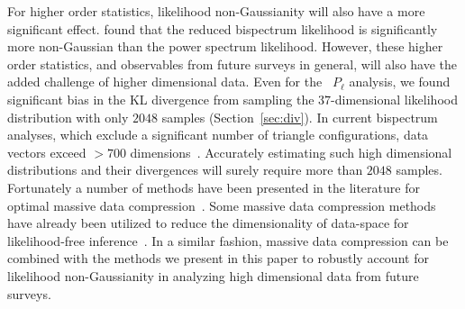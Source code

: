 \documentclass[12pt, letterpaper, preprint]{aastex6}
\newcommand{\Beut}{\citetalias{beutler2017}\xspace}
\let\oldmarginpar\marginpar
\renewcommand\marginpar[1]{\-\oldmarginpar[\raggedleft\footnotesize #1]%
  {\raggedright\footnotesize #1}}
\newcommand{\todo}[1]{\marginpar{\color{red}TODO}{\color{red}#1}}
\begin{document}
{\color{red}
For higher order statistics, likelihood non-Gaussianity will also have a 
more significant effect. \cite{scoccimarro2000} found that the reduced 
bispectrum likelihood is significantly more non-Gaussian than the power spectrum likelihood. 
However, these higher order statistics, and observables from future surveys 
in general, will also have the added challenge of higher dimensional data. 
Even for the \Beut~$P_\ell$ analysis, we found significant bias in the KL 
divergence from sampling the $37$-dimensional likelihood distribution 
with only $2048$ samples (Section~\ref{sec:div}). In current bispectrum 
analyses, which exclude a significant number of triangle configurations, 
data vectors exceed ${>}700$ dimensions~\citep[e.g.][]{gil-marin2017}. 
Accurately estimating such high dimensional distributions and their 
divergences will surely require more than $2048$ samples. Fortunately a 
number of methods have been presented in the literature for optimal 
massive data compression~\citep{tegmark1997, alsing2017, heavens2017, charnock2018}.
Some massive data compression methods have already been utilized to reduce 
the dimensionality of data-space for likelihood-free inference~\citep{papamakarios2016, alsing2018}. 
In a similar fashion, massive data compression can be combined with the methods 
we present in this paper to robustly account for likelihood non-Gaussianity in 
analyzing high dimensional data from future surveys.
}

\end{document}
